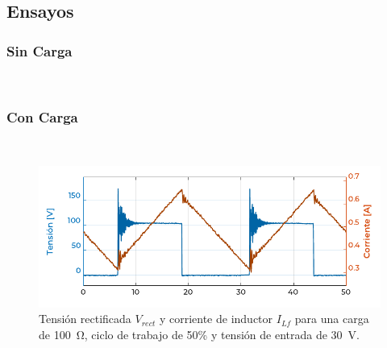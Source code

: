 \subsection{Ensayos}

\subsubsection{Sin Carga}

\lipsum[1]\\

\subsubsection{Con Carga}

\lipsum[2]\\

\begin{figure}[h]
    \centering
    \includegraphics[scale=1.1]{Imagenes/Grafico DC50 RL100 VIN30.pdf}
    \caption{Tensión rectificada $V_{rect}$ y corriente de inductor $I_{Lf}$ para una carga de \SI[]{100}{\ohm}, ciclo de trabajo de 50\% y tensión de entrada de \SI[]{30}{\volt}.}
    \label{dc50_rL100_vin30}
\end{figure}

\lipsum[3]\\